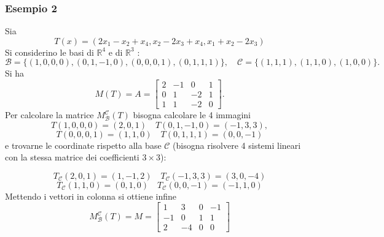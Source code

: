 \documentclass[12pt,a4paper,oneside]{article}
\begin{document}
\subsubsection*{Esempio 2}
Sia
$$
	T(x)=\left(2 x_1-x_2+x_4, x_2-2 x_3+x_4, x_1+x_2-2 x_3\right)
$$
Si considerino le basi di $\mathbb{R}^4$ e di $\mathbb{R}^3$ :
$$
	\mathcal{B}=\{(1,0,0,0),(0,1,-1,0),(0,0,0,1),(0,1,1,1)\}, \quad \mathcal{C}=\{(1,1,1),(1,1,0),(1,0,0)\} .
$$
Si ha
$$
	M(T)=A=\left[\begin{array}{rrrr}
			2 & -1 & 0  & 1 \\
			0 & 1  & -2 & 1 \\
			1 & 1  & -2 & 0
		\end{array}\right] .
$$
Per calcolare la matrice $M_{\mathcal{B}}^{\mathcal{C}}(T)$ bisogna calcolare le 4 immagini
\[
	T(1,0,0,0)=(2,0,1) \quad  T(0,1,-1,0)=(-1,3,3),
\]
\[
	T(0,0,0,1)=(1,1,0) \quad  T(0,1,1,1)=(0,0,-1)
\]
e trovarne le coordinate rispetto alla base $\mathcal{C}$ (bisogna risolvere 4 sistemi lineari con la stessa matrice dei coefficienti $3 \times 3$):

\[
	T_{\mathcal{C}}(2,0,1)=(1,-1,2) \quad  T_{\mathcal{C}}(-1,3,3)=(3,0,-4)
\]
\[
	T_{\mathcal{C}}(1,1,0)=(0,1,0) \quad T_{\mathcal{C}}(0,0,-1)=(-1,1,0)
\]
Mettendo i vettori in colonna si ottiene infine
\[
	M_{\mathcal{B}}^{\mathcal{C}}(T)=M=\left[\begin{array}{rrrr}
			1  & 3  & 0 & -1 \\
			-1 & 0  & 1 & 1  \\
			2  & -4 & 0 & 0
		\end{array}\right]
\]
\end{document}
